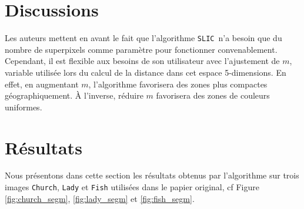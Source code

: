 \documentclass[12pt]{article}
\makeatletter
\newcommand{\slic}{\texttt{SLIC}}
\newcommand{\StatexIndent}[1][3]{%
  \setlength\@tempdima{\algorithmicindent}%
  \Statex\hskip\dimexpr#1\@tempdima\relax}
\makeatother
\begin{document}
\begin{algorithm}
  \caption{\slic}
  \label{alg:slic}
\end{algorithm}

\section{Discussions}

Les auteurs mettent en avant le fait que l'algorithme \slic\ n'a besoin que du nombre de superpixels comme param\`etre pour fonctionner convenablement.
Cependant, il est flexible aux besoins de son utilisateur avec l'ajustement de $m$, variable utilis\'ee lors du calcul de la distance dans cet espace 5-dimensions.
En effet, en augmentant $m$, l'algorithme favorisera des zones plus compactes g\'eographiquement.
\`A l'inverse, r\'eduire $m$ favorisera des zones de couleurs uniformes.


\section{R\'esultats}

Nous pr\'esentons dans cette section les r\'esultats obtenus par l'algorithme sur trois images \texttt{Church}, \texttt{Lady} et \texttt{Fish} utilis\'ees dans le papier original, cf Figure \ref{fig:church_segm}, \ref{fig:lady_segm} et \ref{fig:fish_segm}.
\end{document}
